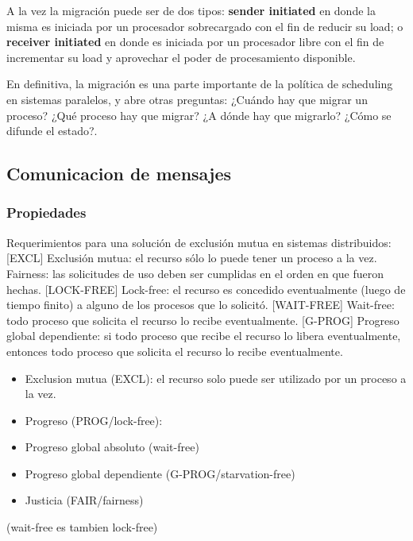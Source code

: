 \documentclass{article}
\begin{document}
A la vez la migración puede ser de dos tipos: \textbf{sender initiated} en donde la misma es iniciada por un procesador sobrecargado con el fin de reducir su load; o \textbf{receiver initiated} en donde es iniciada por un procesador libre con el fin de incrementar su load y aprovechar el poder de procesamiento disponible.

En definitiva, la migración es una parte importante de la política de scheduling en sistemas paralelos, y abre otras preguntas: ¿Cuándo hay que migrar un proceso? ¿Qué proceso hay que migrar? ¿A dónde hay que migrarlo? ¿Cómo se difunde el estado?.

\subsection{Comunicacion de mensajes}

\subsubsection{Propiedades}

Requerimientos para una solución de exclusión mutua en sistemas distribuidos:
[EXCL] Exclusión mutua: el recurso sólo lo puede tener un proceso a la vez.
Fairness: las solicitudes de uso deben ser cumplidas en el orden en que fueron hechas.
[LOCK-FREE] Lock-free: el recurso es concedido eventualmente (luego de tiempo finito) a alguno de los procesos que lo solicitó.
[WAIT-FREE] Wait-free: todo proceso que solicita el recurso lo recibe eventualmente.
[G-PROG] Progreso global dependiente: si todo proceso que recibe el recurso lo libera eventualmente, entonces todo proceso que solicita el recurso lo recibe eventualmente.


\begin{itemize}
 \item Exclusion mutua (EXCL): el recurso solo puede ser utilizado por un proceso a la vez.
 \item Progreso (PROG/lock-free):
 \item Progreso global absoluto (wait-free)
 \item Progreso global dependiente (G-PROG/starvation-free)
 \item Justicia (FAIR/fairness)
\end{itemize}

(wait-free es tambien lock-free)
\end{document}
